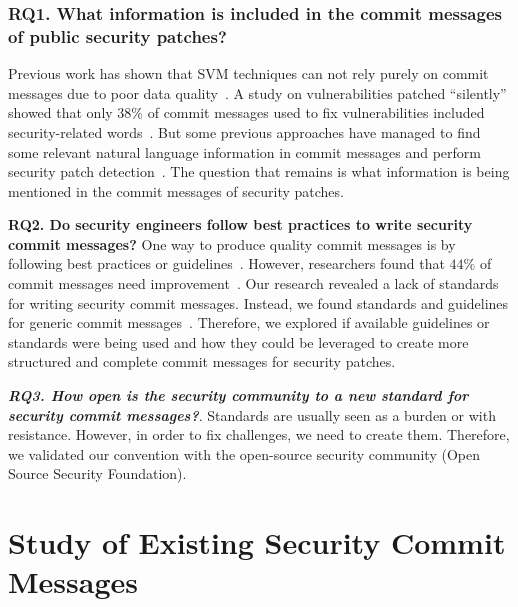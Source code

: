 \subsubsection*{\textbf{RQ1. What information is included in
the commit messages of public security patches?}}

Previous work has shown that SVM techniques can not rely purely on commit messages due to poor data quality~\cite{DBLP:journals/corr/abs-1806-05893}.
A study on vulnerabilities patched ``silently'' showed that only $38\%$ of commit messages used to fix vulnerabilities included security-related words~\cite{9678720}. 
But some previous approaches have managed to find some relevant natural language information in commit messages and perform security patch detection~\cite{reis2017secbench,10.1145/3106237.3117771,SSPatcher2022,DBLP:journals/corr/abs-1807-02458,10.1145/3593434.3593481}. The question 
that remains is what information is being mentioned in the commit messages
of security patches.


\textbf{RQ2. Do security engineers follow best practices to write security commit
messages?} 
One way to produce quality 
commit messages is by following best practices or guidelines~\cite{Tian_2022, convcom,linus,atomic}. However, researchers found that $44\%$ of commit messages need improvement~\cite{Tian_2022}. 
Our research revealed a lack of standards for writing security commit messages. Instead,
we found standards and guidelines for generic commit messages~\cite{convcom, linus, goodcommit}.
Therefore, we explored if available guidelines or standards 
were being used and how they could be leveraged to create more structured and complete commit messages for security patches.

\emph{\textbf{RQ3. How open is the security community to a new standard for security commit messages?}}. Standards are usually seen as a burden or with resistance. However, in order to fix challenges, we need to create them. Therefore, we validated our convention with the open-source security community (Open Source
Security Foundation).


\section{Study of Existing Security Commit Messages}\label{sec:study_design}


